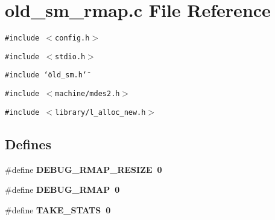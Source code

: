 \section{old\_\-sm\_\-rmap.c File Reference}
\label{old__sm__rmap_8c}
{\tt \#include $<$config.h$>$}\par
{\tt \#include $<$stdio.h$>$}\par
{\tt \#include \char`\"{}old\_\-sm.h\char`\"{}}\par
{\tt \#include $<$machine/mdes2.h$>$}\par
{\tt \#include $<$library/l\_\-alloc\_\-new.h$>$}\par
\subsection*{Defines}
\begin{CompactItemize}
\item 
\#define \bf{DEBUG\_\-RMAP\_\-RESIZE}~0
\item 
\#define \bf{DEBUG\_\-RMAP}~0
\item 
\#define \bf{TAKE\_\-STATS}~0
\end{CompactItemize}

